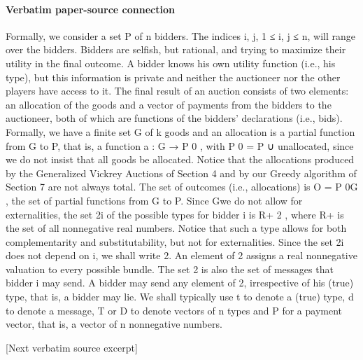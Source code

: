 \documentclass[10pt]{article}
\begin{document}
\paragraph{Verbatim paper-source connection}
\begin{ReviewVerbatim}
Formally, we consider a set P of n bidders. The indices i, j, 1 ≤ i, j ≤ n, will
range over the bidders. Bidders are selfish, but rational, and trying to maximize their
utility in the final outcome. A bidder knows his own utility function (i.e., his type),
but this information is private and neither the auctioneer nor the other players have
access to it. The final result of an auction consists of two elements: an allocation
of the goods and a vector of payments from the bidders to the auctioneer, both of
which are functions of the bidders’ declarations (i.e., bids). Formally, we have a
finite set G of k goods and an allocation is a partial function from G to P, that is, a
function a : G → P 0 , with P 0 = P ∪ {unallocated}, since we do not insist that all
goods be allocated. Notice that the allocations produced by the Generalized Vickrey
Auctions of Section 4 and by our Greedy algorithm of Section 7 are not always
total. The set of outcomes (i.e., allocations) is O = P 0G , the set of partial functions
from G to P. Since Gwe do not allow for externalities, the set 2i of the possible types
for bidder i is R+ 2 , where R+ is the set of all nonnegative real numbers. Notice
that such a type allows for both complementarity and substitutability, but not for
externalities. Since the set 2i does not depend on i, we shall write 2. An element
of 2 assigns a real nonnegative valuation to every possible bundle. The set 2 is
also the set of messages that bidder i may send. A bidder may send any element of
2, irrespective of his (true) type, that is, a bidder may lie. We shall typically use t
to denote a (true) type, d to denote a message, T or D to denote vectors of n types
and P for a payment vector, that is, a vector of n nonnegative numbers.

[Next verbatim source excerpt]


\end{ReviewVerbatim}
\end{document}
